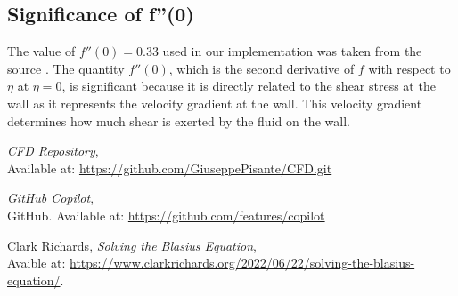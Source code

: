 \documentclass{article}
\begin{document}
\subsection{Significance of f''(0)}
The value of \( f''(0) = 0.33 \) used in our implementation was taken from the source \cite{clarkrichards2022}. The
quantity \( f''(0) \), which is the second derivative of \( f \) with respect to \( \eta \) at \( \eta = 0 \), is significant
because it is directly related to the shear stress at the wall as it represents the velocity gradient at the wall.
This velocity gradient determines how much shear is exerted by the fluid on the wall. 

\begin{thebibliography}{9}
    \textit{CFD Repository},\\
    Available at: \url{https://github.com/GiuseppePisante/CFD.git}
    
    \textit{GitHub Copilot},\\
    GitHub. Available at: \url{https://github.com/features/copilot}

     Clark Richards, 
    \textit{Solving the Blasius Equation},\\
    Avaible at: \url{https://www.clarkrichards.org/2022/06/22/solving-the-blasius-equation/}.
    \end{thebibliography}
       
\end{document}
